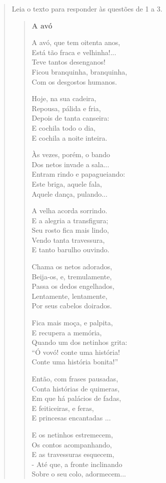 \begin{quote}
Leia o texto para responder às questões de 1 a 3.

\begin{verse}
\textbf{A avó}

A avó, que tem oitenta anos,\\
Está tão fraca e velhinha!...\\
Teve tantos desenganos!\\
Ficou branquinha, branquinha,\\
Com os desgostos humanos.


Hoje, na sua cadeira,\\
Repousa, pálida e fria,\\
Depois de tanta canseira:\\
E cochila todo o dia,\\
E cochila a noite inteira.


Às vezes, porém, o bando\\
Dos netos invade a sala...\\
Entram rindo e papagueiando:\\
Este briga, aquele fala,\\
Aquele dança, pulando...


A velha acorda sorrindo.\\
E a alegria a transfigura;\\
Seu rosto fica mais lindo,\\
Vendo tanta travessura,\\
E tanto barulho ouvindo.


Chama os netos adorados,\\
Beija-os, e, tremulamente,\\
Passa os dedos engelhados,\\
Lentamente, lentamente,\\
Por seus cabelos doirados.


Fica mais moça, e palpita,\\
E recupera a memória,\\
Quando um dos netinhos grita:\\
“Ó vovó! conte uma história!\\
Conte uma história bonita!”


Então, com frases pausadas,\\
Conta histórias de quimeras,\\
Em que há palácios de fadas,\\
E feiticeiras, e feras,\\
E princesas encantadas ...


E os netinhos estremecem,\\
Os contos acompanhando,\\
E as travessuras esquecem,\\
- Até que, a fronte inclinando\\
Sobre o seu colo, adormecem...
\end{verse}


\end{quote}
